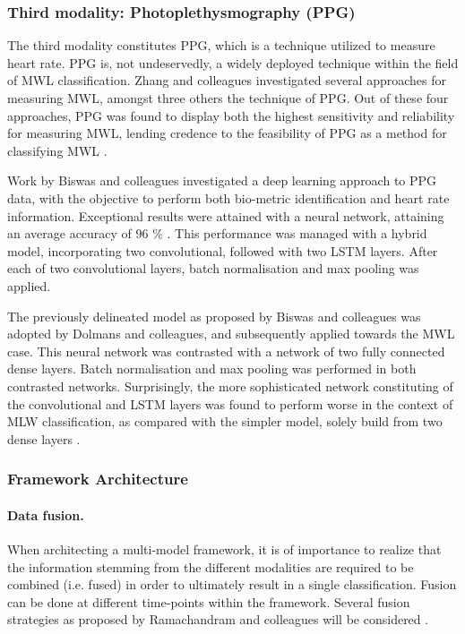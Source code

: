 \documentclass{article}
\begin{document}
\subsubsection{Third modality: Photoplethysmography (PPG)}
The third modality constitutes PPG, which is a technique utilized to measure heart rate. PPG is, not undeservedly, a widely deployed technique within the field of MWL classification. Zhang and colleagues investigated several approaches for measuring MWL, amongst three others the technique of PPG. Out of these four approaches, PPG was found to display both the highest sensitivity and reliability for measuring MWL, lending credence to the feasibility of PPG as a method for classifying MWL \cite{zhang2018evaluating}. 

Work by Biswas and colleagues investigated a deep learning approach to PPG data, with the objective to perform both bio-metric identification and heart rate information. Exceptional results were attained with a neural network, attaining an average accuracy of 96 \% \cite{biswas2019cornet}. This performance was managed with a hybrid model, incorporating two convolutional, followed with two LSTM layers. After each of two convolutional layers, batch normalisation and max pooling was applied. 

The previously delineated model as proposed by Biswas and colleagues was adopted by Dolmans and colleagues, and subsequently applied towards the MWL case. This neural network was contrasted with a network of two fully connected dense layers. Batch normalisation and max pooling was performed in both contrasted networks. Surprisingly, the more sophisticated network constituting of the convolutional and LSTM layers was found to perform worse in the context of MLW classification, as compared with the simpler model, solely build from two dense layers \cite{dolmans2020perceived}.   

\subsubsection{Framework Architecture} 

\paragraph{Data fusion.}  
When architecting a multi-model framework, it is of importance to realize that the information stemming from the different modalities are required to be combined (i.e. fused) in order to ultimately result in a single classification. Fusion can be done at different time-points within the framework. Several fusion strategies as proposed by Ramachandram and colleagues will be considered \cite{ramachandram2017deep}.
\end{document}
